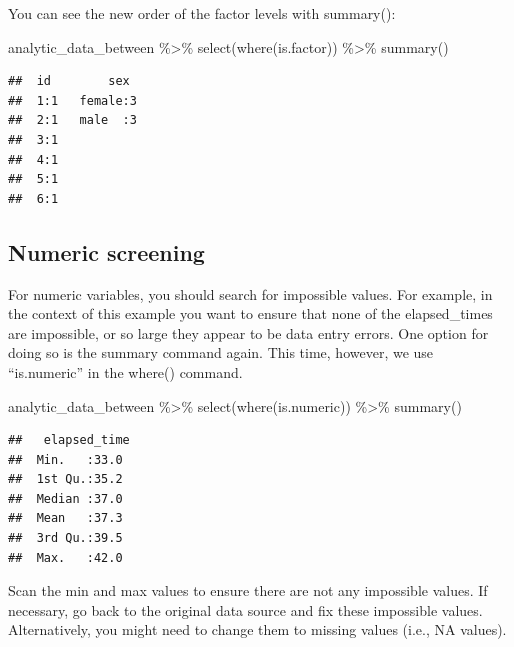 \documentclass[
]{krantz}
\makeatletter
\newenvironment{Shaded}{\begin{snugshade}}{\end{snugshade}}
\newcommand{\FunctionTok}[1]{\textcolor[rgb]{0,0,0}{#1}}
\newcommand{\NormalTok}[1]{#1}
\newcommand{\SpecialCharTok}[1]{\textcolor[rgb]{0,0,0}{#1}}
\newenvironment{kframe}{%
\medskip{}
\setlength{\fboxsep}{.8em}
 \def\at@end@of@kframe{}%
 \ifinner\ifhmode%
  \def\at@end@of@kframe{\end{minipage}}%
  \begin{minipage}{\columnwidth}%
 \fi\fi%
 \def\FrameCommand##1{\hskip\@totalleftmargin \hskip-\fboxsep
 \colorbox{shadecolor}{##1}\hskip-\fboxsep
     \hskip-\linewidth \hskip-\@totalleftmargin \hskip\columnwidth}%
 \MakeFramed {\advance\hsize-\width
   \@totalleftmargin\z@ \linewidth\hsize
   \@setminipage}}%
 {\par\unskip\endMakeFramed%
 \at@end@of@kframe}
\renewenvironment{Shaded}{\begin{kframe}}{\end{kframe}}
\makeatother
\begin{document}
You can see the new order of the factor levels with summary():

\begin{Shaded}
\begin{Highlighting}[]
\NormalTok{analytic\_data\_between }\SpecialCharTok{\%\textgreater{}\%}
  \FunctionTok{select}\NormalTok{(}\FunctionTok{where}\NormalTok{(is.factor)) }\SpecialCharTok{\%\textgreater{}\%}
  \FunctionTok{summary}\NormalTok{()}
\end{Highlighting}
\end{Shaded}

\begin{verbatim}
##  id        sex   
##  1:1   female:3  
##  2:1   male  :3  
##  3:1             
##  4:1             
##  5:1             
##  6:1
\end{verbatim}

\hypertarget{numeric-screening-2}{%
\subsection{Numeric screening}\label{numeric-screening-2}}

For numeric variables, you should search for impossible values. For example, in the context of this example you want to ensure that none of the elapsed\_times are impossible, or so large they appear to be data entry errors. One option for doing so is the summary command again. This time, however, we use ``is.numeric'' in the where() command.

\begin{Shaded}
\begin{Highlighting}[]
\NormalTok{analytic\_data\_between }\SpecialCharTok{\%\textgreater{}\%}
  \FunctionTok{select}\NormalTok{(}\FunctionTok{where}\NormalTok{(is.numeric)) }\SpecialCharTok{\%\textgreater{}\%}
  \FunctionTok{summary}\NormalTok{()}
\end{Highlighting}
\end{Shaded}

\begin{verbatim}
##   elapsed_time 
##  Min.   :33.0  
##  1st Qu.:35.2  
##  Median :37.0  
##  Mean   :37.3  
##  3rd Qu.:39.5  
##  Max.   :42.0
\end{verbatim}

Scan the min and max values to ensure there are not any impossible values. If necessary, go back to the original data source and fix these impossible values. Alternatively, you might need to change them to missing values (i.e., NA values).
\end{document}

